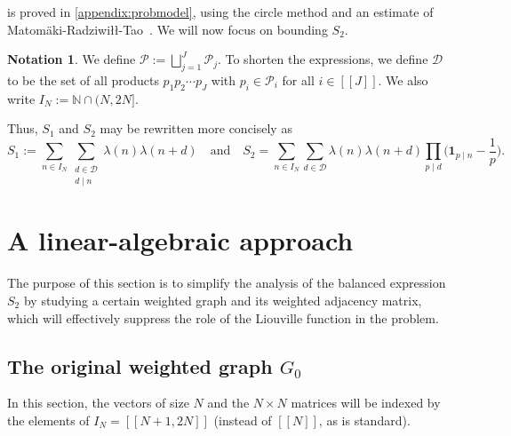 \documentclass[11pt]{amsart}
\theoremstyle{definition}
\newtheorem{notation}[theorem]{Notation}
\newcommand{\interval}[2]{[\![#1,#2]\!] }
\newcommand{\sinterval}[1]{[\![#1]\!] }
\newcommand{\ind}[1]{\mathbf{1}_{#1}}
\newcommand{\N}{I_N}
\newcommand{\primes}{\mathcal{P}}
\newcommand{\D}{\mathcal{D}}
\newcommand{\graph}{G}
\newcommand{\repR}{J}
\newcommand{\newR}{\sinterval{J}}
\begin{document}
 is proved in \cref{appendix:probmodel}, using the circle method and an estimate of Matomäki-Radziwiłł-Tao~\cite{MRT}. We will now focus on bounding $S_2$.



\begin{notation}
\label{not:bigP}
We define $\primes := \bigsqcup_{j=1}^{\repR} \primes_j$. To shorten the expressions, we define $\D$ to be the set of all products $p_1p_2\cdots p_{\repR}$ with $p_i\in \primes_i$ for all $i\in \newR$. We also write $\N := \mathbb{N} \cap (N, 2N]$.

Thus, $S_1$ and $S_2$ may be rewritten more concisely as
\begin{equation*}
S_1 := \sum_{n\in \N} \sum_{\substack{d\in \D\\ d\mid n}} \lambda(n) \lambda(n+d)\quad \text{and}\quad S_2 = \sum_{n\in \N} \sum_{d\in \D} \lambda(n) \lambda(n+d) \prod_{p\mid d} \bigg(\ind{p\mid n} - \frac{1}{p} \bigg).
\end{equation*}
\end{notation}





\section{A linear-algebraic approach}
\label{sec:linalg}


The purpose of this section is to simplify the analysis of the balanced expression $S_2$ by studying a certain weighted graph and its weighted adjacency matrix, which will effectively suppress the role of the Liouville function in the problem.

\subsection{The original weighted graph $\graph_0$}

In this section, the vectors of size $N$ and the $N\times N$ matrices will be indexed by the elements of $\N = \interval{N+1}{2N}$ (instead of $\sinterval{N}$, as is standard). 
\end{document}
